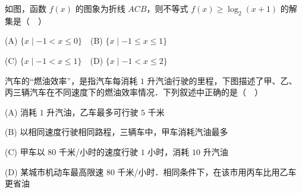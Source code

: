 \begin{question}
如图，函数 \(f(x)\) 的图象为折线 \(ACB\)，则不等式 \(f(x)\geqslant\log_{2}(x+1)\) 的解集是（　）
\nopagebreak[4]
\begin{center}\end{center}
\nopagebreak[4]
(A) \(\{x\mid -1<x\leqslant 0\}\)　(B) \(\{x\mid -1\leqslant x\leqslant 1\}\)

(C) \(\{x\mid -1<x\leqslant 1\}\)　(D) \(\{x\mid -1<x\leqslant 2\}\)

\Needspace{0.4\textheight}
\end{question}
\begin{question}
汽车的“燃油效率”，是指汽车每消耗 \(1\) 升汽油行驶的里程，下图描述了甲、乙、丙三辆汽车在不同速度下的燃油效率情况．下列叙述中正确的是（　）
\nopagebreak[4]
\begin{center}\end{center}
\nopagebreak[4]
(A) 消耗 \(1\) 升汽油，乙车最多可行驶 \(5\) 千米

(B) 以相同速度行驶相同路程，三辆车中，甲车消耗汽油最多

(C) 甲车以 \(80\) 千米/小时的速度行驶 \(1\) 小时，消耗 \(10\) 升汽油

(D) 某城市机动车最高限速 \(80\) 千米/小时．相同条件下，在该市用丙车比用乙车更省油

\end{question}

